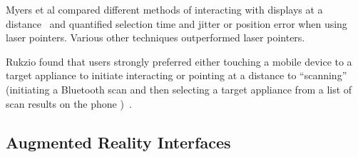 Myers et al compared different methods of interacting with displays at a distance~\cite{myers_interacting_2002} and quantified selection time and jitter or position error when using laser pointers. Various other techniques outperformed laser pointers.

Rukzio found that users strongly preferred either touching a mobile device to a target appliance to initiate interacting or pointing at a distance to ``scanning'' (initiating a Bluetooth scan and then selecting a target appliance from a list of scan results on the phone )~\cite{rukzio_experimental_2006}.

\subsection{Augmented Reality Interfaces}

